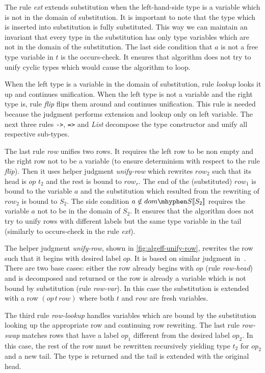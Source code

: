 \documentclass[inz, english, longabstract]{iithesis}
\begin{document}
The rule \emph{ext} extends substitution when the left-hand-side type is a variable which is not in the domain of substitution.
It is important to note that the type which is inserted into substitution is fully substituted.
This way we can maintain an invariant that every type in the substitution has only type variables which are not in the domain of the substitution.
The last side condition that $a$ is not a free type variable in $t$ is the occurs-check.
It ensures that algorithm does not try to unify cyclic types which would cause the algorithm to loop.

When the left type is a variable in the domain of substitution, rule \emph{lookup} looks it up and continues unification.
When the left type is not a variable and the right type is, rule \emph{flip} flips them around and continues unification.
This rule is needed because the judgment performs extension and lookup only on left variable.
The next three rules \texttt{->}, \texttt{=>} and \emph{List} decompose the type constructor and unify all respective sub-types.

The last rule \emph{row} unifies two rows.
It requires the left row to be non empty and the right row not to be a variable (to ensure determinism with respect to the rule \emph{flip}).
Then it uses helper judgment \emph{unify-row} which rewrites $row_2$ such that its head is $op \, \, t_2$ and the rest is bound to $row_r$.
The end of the (substituted) $row_1$ is bound to the variable $a$ and the substitution which resulted from the rewriting of $row_2$ is bound to $S_2$.
The side condition $a \notin dom\mhyphen S [\![S_2]\!] $ requires the variable $a$ not to be in the domain of $S_2$.
It ensures that the algorithm does not try to unify rows with different labels but the same type variable in the tail (similarly to occurs-check in the rule \emph{ext}).

The helper judgment \emph{unify-row}, shown in \autoref{fig:algeff-unify-row}, rewrites the row such that it begins with desired label $op$.
It is based on similar judgment in~\cite{Leijen2005}.
There are two base cases: either the row already begins with $op$ (rule \emph{row-head}) and is decomposed and returned or the row is already a variable which is not bound by substitution (rule \emph{row-var}).
In this case the substitution is extended with a row $(op \, t \, row)$ where both $t$ and $row$ are fresh variables.

The third rule \emph{row-lookup} handles variables which are bound by the substitution looking up the appropriate row and continuing row rewriting.
The last rule \emph{row-swap} matches rows that have a label $op_1$ different from the desired label $op_2$.
In this case, the rest of the row must be rewritten recursively yielding type $t_2$ for $op_2$ and a new tail.
The type is returned and the tail is extended with the original head.
\end{document}
